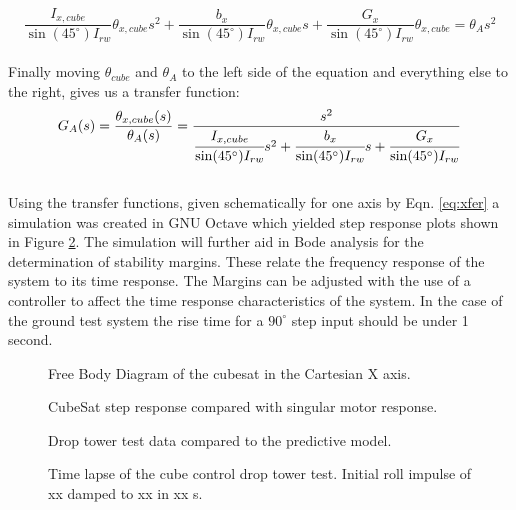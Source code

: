 \documentclass[]{aiaa-tc}%
\begin{document}
\[
\frac{I_{x,cube}}{\sin(45^{\circ}) I_{rw}} \theta_{x,cube} s^2 +
\frac{b_x}{\sin(45^{\circ}) I_{rw}} \theta_{x,cube} s +
\frac{G_x}{\sin(45^{\circ}) I_{rw}} \theta_{x,cube} = \theta_A s^2
\]\\
	
Finally moving $\theta_{cube}$ and $\theta_A$ to the left side of the equation and everything else to the right, gives us a transfer function:\\

\begin{equation}
\label{eq:xfer}
G_A(s)=\frac{\theta_{x,cube}(s)}{\theta_A(s)}=\frac{s^2}{\cfrac{I_{x,cube}}{\sin(45^{\circ}) I_{rw}}s^2 + \cfrac{b_x}{\sin(45^{\circ}) I_{rw}}s + \cfrac{G_x}{\sin(45^{\circ}) I_{rw}}}
\end{equation}\\
	
Using the transfer functions, given schematically for one axis by Eqn. \ref{eq:xfer} a simulation was created in GNU Octave which yielded step response plots shown in Figure \ref{fig:simulation}. The simulation will further aid in Bode analysis for the determination of stability margins. These relate the frequency response of the system to its time response. The Margins can be adjusted with the use of a controller to affect the time response characteristics of the system. In the case of the ground test system the rise time for a $90^{\circ}$ step input should be under 1 second. 
\begin{figure}[h!]
  \centering
  
  \caption{Free Body Diagram of the cubesat in the Cartesian X axis.}
  \label{fig:FBD}
\end{figure}

\begin{figure}[h!]
  \centering
  {\footnotesize }
  \caption{CubeSat step response compared with singular motor response.}
  \label{fig:simulation}
\end{figure}

\begin{figure}[!ht]
 \centering
 {\footnotesize }
 \caption{Drop tower test data compared to the predictive model.}
\end{figure}

\begin{figure}[!ht]
 \centering
 {}
 \caption{Time lapse of the cube control drop tower test. Initial roll impulse of xx damped to xx in xx s.}
\end{figure}
\end{document}
